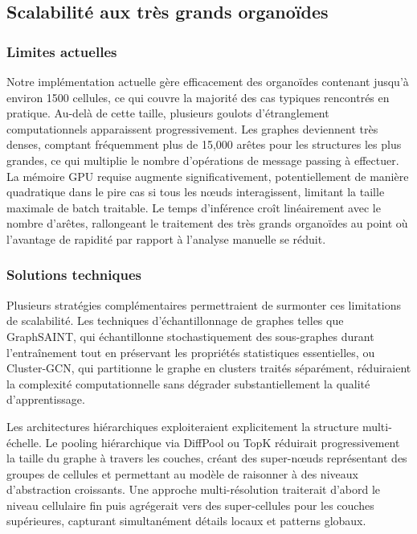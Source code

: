 \subsection{Scalabilité aux très grands organoïdes}

\subsubsection{Limites actuelles}

Notre implémentation actuelle gère efficacement des organoïdes contenant jusqu'à environ 1500 cellules, ce qui couvre la majorité des cas typiques rencontrés en pratique. Au-delà de cette taille, plusieurs goulots d'étranglement computationnels apparaissent progressivement. Les graphes deviennent très denses, comptant fréquemment plus de 15,000 arêtes pour les structures les plus grandes, ce qui multiplie le nombre d'opérations de message passing à effectuer. La mémoire GPU requise augmente significativement, potentiellement de manière quadratique dans le pire cas si tous les nœuds interagissent, limitant la taille maximale de batch traitable. Le temps d'inférence croît linéairement avec le nombre d'arêtes, rallongeant le traitement des très grands organoïdes au point où l'avantage de rapidité par rapport à l'analyse manuelle se réduit.

\subsubsection{Solutions techniques}

Plusieurs stratégies complémentaires permettraient de surmonter ces limitations de scalabilité. Les techniques d'échantillonnage de graphes telles que GraphSAINT, qui échantillonne stochastiquement des sous-graphes durant l'entraînement tout en préservant les propriétés statistiques essentielles, ou Cluster-GCN, qui partitionne le graphe en clusters traités séparément, réduiraient la complexité computationnelle sans dégrader substantiellement la qualité d'apprentissage.

Les architectures hiérarchiques exploiteraient explicitement la structure multi-échelle. Le pooling hiérarchique via DiffPool ou TopK réduirait progressivement la taille du graphe à travers les couches, créant des super-nœuds représentant des groupes de cellules et permettant au modèle de raisonner à des niveaux d'abstraction croissants. Une approche multi-résolution traiterait d'abord le niveau cellulaire fin puis agrégerait vers des super-cellules pour les couches supérieures, capturant simultanément détails locaux et patterns globaux.

